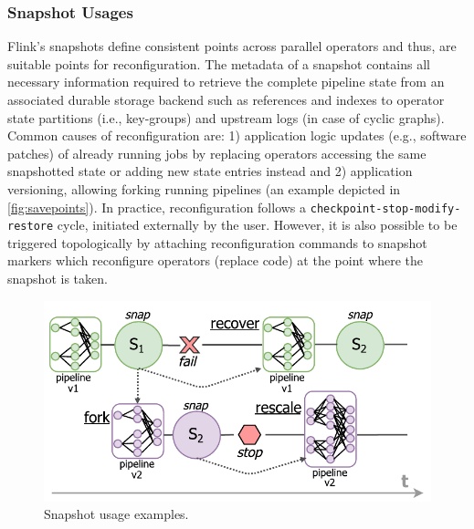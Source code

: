 \subsubsection{Snapshot Usages}
\label{sec:savepoints}

Flink's snapshots define consistent points across parallel operators and thus, are suitable points for reconfiguration. The metadata of a snapshot contains all necessary information required to retrieve the complete pipeline state from an associated durable storage backend such as references and indexes to operator state partitions (i.e., key-groups) and upstream logs (in case of cyclic graphs). Common causes of reconfiguration are: 1) application logic updates (e.g., software patches) of already running jobs by replacing operators accessing the same snapshotted state or adding new state entries instead and 2) application versioning, allowing forking running pipelines (an example depicted in \autoref{fig:savepoints}). In practice, reconfiguration follows a \texttt{checkpoint-stop-modify-restore} cycle, initiated externally by the user. However, it is also possible to be triggered topologically by attaching reconfiguration commands to snapshot markers which reconfigure operators (replace code) at the point where the snapshot is taken. 

\begin{figure}[t]
\centering
\includegraphics[width=\textwidth / 2]{figures/savepointsexamples.pdf}
\vspace{-6mm}
\caption{Snapshot usage examples.} 
\label{fig:savepoints}
\vspace{-4mm}
\end{figure}

